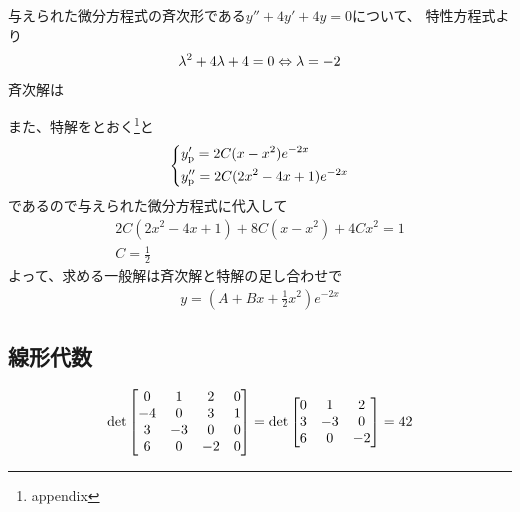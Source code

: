 \begin{ans*}
  与えられた微分方程式の斉次形である$y'' + 4y' + 4y = 0$について、
  特性方程式より
  \begin{gather}
    {\lambda}^2+4{\lambda}+4=0\Leftrightarrow {\lambda} = -2
  \end{gather}
  斉次解は

  また、特解をとおく\footnote{appendix}と
  \begin{gather}
    \begin{dcases*}
      y'_{\rm{p}} = 2C(x-x^2)e^{-2x} \\
      y''_{\rm{p}}= 2C(2x^2-4x+1)e^{-2x}
    \end{dcases*}
  \end{gather}
  であるので与えられた微分方程式に代入して
  \begin{gather}
    2C(2x^2 - 4x + 1) + 8C(x-x^2) + 4Cx^2 = 1 \\
    C = \frac{1}{2}
  \end{gather}
  よって、求める一般解は斉次解と特解の足し合わせで
  \begin{gather}
    y = \left(A + Bx + \frac{1}{2}x^2\right)e^{-2x}
  \end{gather}
\end{ans*}


\newpage
\subsection{線形代数}
\begin{ans*}
  \begin{align}
    \det
    \begin{bmatrix}
      0 & 1 & 2 & 0 \\
      -4 & 0 & 3 & 1 \\
      3 & -3 & 0 & 0 \\
      6 & 0 & -2 & 0 \\
    \end{bmatrix}
    = \det
    \begin{bmatrix}
      0  & 1  & 2  \\
      3  & -3 & 0  \\
      6  & 0  & -2 \\
    \end{bmatrix}
    = 42
  \end{align}
\end{ans*}

